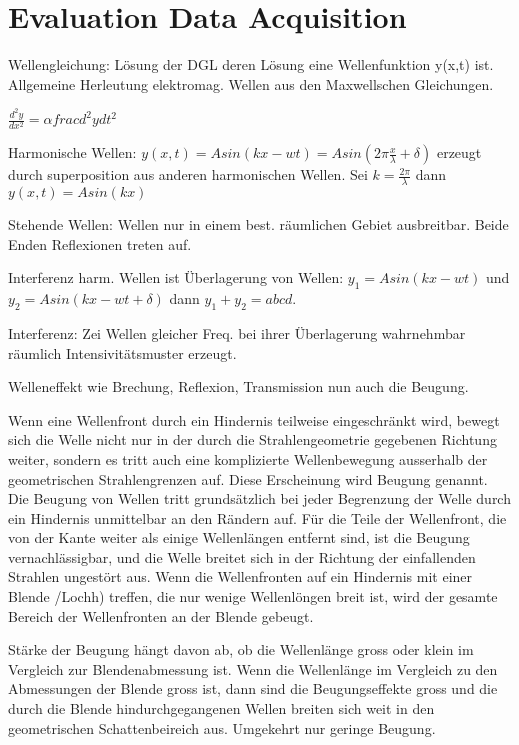 
\section{Evaluation Data Acquisition}

Wellengleichung: Lösung der DGL deren Lösung eine Wellenfunktion y(x,t) ist. Allgemeine Herleutung elektromag. Wellen aus den Maxwellschen Gleichungen.

$\frac{d^2 y}{dx^2} = \alpha frac{d^2 y}{dt^2}$

Harmonische Wellen: $y(x,t) = A sin(kx - wt) = A sin(2\pi \frac{x}{\lambda} + \delta)$ erzeugt durch superposition aus anderen harmonischen Wellen. Sei $k = \frac{2 \pi}{\lambda}$ dann $y(x,t) = A sin(kx)$

Stehende Wellen: Wellen nur in einem best. räumlichen Gebiet ausbreitbar. Beide Enden Reflexionen treten auf.

Interferenz harm. Wellen ist Überlagerung von Wellen: $y_1 = A sin(kx - wt)$ und $y_2 = A sin(kx - wt + \delta)$ dann $y_1 + y_2 = abcd$.

Interferenz: Zei Wellen gleicher Freq. bei ihrer Überlagerung wahrnehmbar räumlich Intensivitätsmuster erzeugt.

Welleneffekt wie Brechung, Reflexion, Transmission nun auch die Beugung.

Wenn eine Wellenfront durch ein Hindernis teilweise eingeschränkt wird, bewegt sich die Welle nicht nur in der durch die Strahlengeometrie gegebenen Richtung weiter, sondern es tritt auch eine komplizierte Wellenbewegung ausserhalb der geometrischen Strahlengrenzen auf. Diese Erscheinung wird Beugung genannt. Die Beugung von Wellen tritt grundsätzlich bei jeder Begrenzung der Welle durch ein Hindernis unmittelbar an den Rändern auf. Für die Teile der Wellenfront, die von der Kante weiter als einige Wellenlängen entfernt sind, ist die Beugung vernachlässigbar, und die Welle breitet sich in der Richtung der einfallenden Strahlen ungestört aus. Wenn die Wellenfronten auf ein Hindernis mit einer Blende /Lochh) treffen, die nur wenige Wellenlöngen breit ist, wird der gesamte Bereich der Wellenfronten an der Blende gebeugt. 

Stärke der Beugung hängt davon ab, ob die Wellenlänge gross oder klein im Vergleich zur Blendenabmessung ist. Wenn die Wellenlänge im Vergleich zu den Abmessungen der Blende gross ist, dann sind die Beugungseffekte gross und die durch die Blende hindurchgegangenen Wellen breiten sich weit in den geometrischen Schattenbeireich aus. Umgekehrt nur geringe Beugung.


